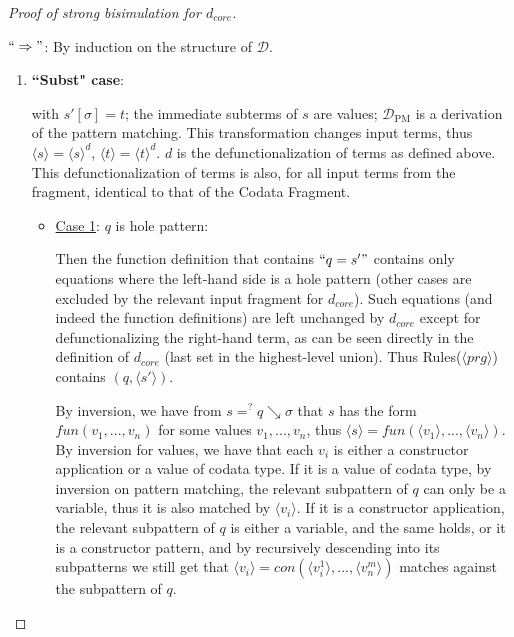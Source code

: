 \begin{proof}[Proof of strong bisimulation for $d_{core}$] ~

$`` \Rightarrow "$: By induction on the structure of $\mathcal{D}$.

\begin{enumerate}
\item \textbf{``Subst" case}:

\begin{prooftree}
\end{prooftree}

with $s'[\sigma] = t$; the immediate subterms of $s$ are values; $\mathcal{D}_{\textrm{PM}}$ is a derivation of the pattern matching. This transformation changes input terms, thus $\langle s \rangle = \langle s \rangle^d$, $\langle t \rangle = \langle t \rangle^d$. $d$ is the defunctionalization of terms as defined above. This defunctionalization of terms is also, for all input terms from the fragment, identical to that of the Codata Fragment.

\begin{itemize}

\item \underline{Case 1}: $q$ is hole pattern:

Then the function definition that contains $`` q = s' "$ contains only equations where the left-hand side is a hole pattern (other cases are excluded by the relevant input fragment for $d_{core}$). Such equations (and indeed the function definitions) are left unchanged by $d_{core}$ except for defunctionalizing the right-hand term, as can be seen directly in the definition of $d_{core}$ (last set in the highest-level union). Thus Rules($\langle prg \rangle$) contains $(q, \langle s' \rangle)$.

By inversion, we have from $s =^? q \searrow \sigma$ that $s$ has the form $fun(v_1, ..., v_n)$ for some values $v_1, ..., v_n$, thus $\langle s \rangle = fun(\langle v_1 \rangle, ..., \langle v_n \rangle)$. By inversion for values, we have that each $v_i$ is either a constructor application or a value of codata type. If it is a value of codata type, by inversion on pattern matching, the relevant subpattern of $q$ can only be a variable, thus it is also matched by $\langle v_i \rangle$. If it is a constructor application, the relevant subpattern of $q$ is either a variable, and the same holds, or it is a constructor pattern, and by recursively descending into its subpatterns we still get that $\langle v_i \rangle = con(\langle v^1_i \rangle, ..., \langle v^m_n \rangle)$ matches against the subpattern of $q$.


\end{itemize}
\end{enumerate}
\end{proof}
